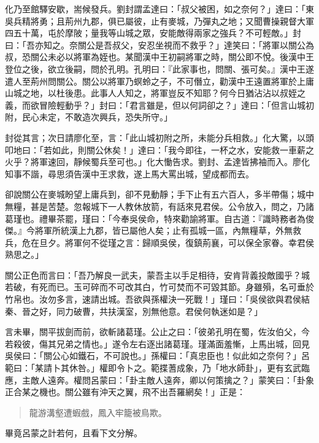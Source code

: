 化乃至館驛安歇，耑候發兵。劉封謂孟達曰：「叔父被困，如之奈何？」達曰：「東吳兵精將勇；且荊州九郡，俱已屬彼，止有麥城，乃彈丸之地；又聞曹操親督大軍四五十萬，屯於摩陂；量我等山城之眾，安能敵得兩家之強兵？不可輕敵。」封曰：「吾亦知之。奈關公是吾叔父，安忍坐視而不救乎？」達笑曰：「將軍以關公為叔，恐關公未必以將軍為姪也。某聞漢中王初嗣將軍之時，關公即不悅。後漢中王登位之後，欲立後嗣，問於孔明。孔明曰：『此家事也，問關、張可矣。』漢中王遂遣人至荊州問關公。關公以將軍乃螟蛉之子，不可僭立，勸漢中王遠置將軍於上庸山城之地，以杜後患。此事人人知之，將軍豈反不知耶？何今日猶沾沾以叔姪之義，而欲冒險輕動乎？」封曰：「君言雖是，但以何詞卻之？」達曰：「但言山城初附，民心未定，不敢造次興兵，恐失所守。」

封從其言；次日請廖化至，言：「此山城初附之所，未能分兵相救。」化大驚，以頭叩地曰：「若如此，則關公休矣！」達曰：「我今即往，一杯之水，安能救一車薪之火乎？將軍速回，靜候蜀兵至可也。」化大慟告求。劉封、孟達皆拂袖而入。廖化知事不諧，尋思須告漢中王求救，遂上馬大罵出城，望成都而去。

卻說關公在麥城盼望上庸兵到，卻不見動靜；手下止有五六百人，多半帶傷；城中無糧，甚是苦楚。忽報城下一人教休放箭，有話來見君侯。公令放入，問之，乃諸葛瑾也。禮畢茶罷，瑾曰：「今奉吳侯命，特來勸諭將軍。自古道：『識時務者為俊傑。』今將軍所統漢上九郡，皆已屬他人矣；止有孤城一區，內無糧草，外無救兵，危在旦夕。將軍何不從瑾之言：歸順吳侯，復鎮荊襄，可以保全家眷。幸君侯熟思之。」

關公正色而言曰：「吾乃解良一武夫，蒙吾主以手足相待，安肯背義投敵國乎？城若破，有死而已。玉可碎而不可改其白，竹可焚而不可毀其節。身雖殞，名可垂於竹帛也。汝勿多言，速請出城。吾欲與孫權決一死戰！」瑾曰：「吳侯欲與君侯結秦、晉之好，同力破曹，共扶漢室，別無他意。君侯何執迷如是？」

言未畢，關平拔劍而前，欲斬諸葛瑾。公止之曰：「彼弟孔明在蜀，佐汝伯父，今若殺彼，傷其兄弟之情也。」遂令左右逐出諸葛瑾。瑾滿面羞慚，上馬出城，回見吳侯曰：「關公心如鐵石，不可說也。」孫權曰：「真忠臣也！似此如之奈何？」呂範曰：「某請卜其休咎。」權即令卜之。範揲蓍成象，乃「地水師卦」，更有玄武臨應，主敵人遠奔。權問呂蒙曰：「卦主敵人遠奔，卿以何策擒之？」蒙笑曰：「卦象正合某之機也。關公雖有沖天之翼，飛不出吾羅網矣！」正是：

\begin{quote}
龍游溝壑遭蝦戲，鳳入牢籠被鳥欺。
\end{quote}

畢竟呂蒙之計若何，且看下文分解。
